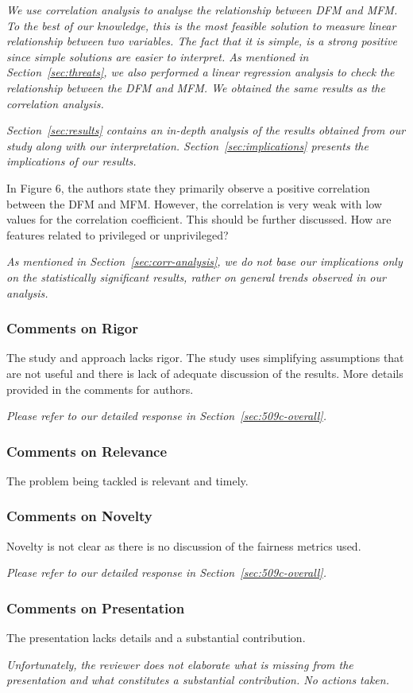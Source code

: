 \documentclass[conference,review,anonymous]{IEEEtran}
\newcommand{\highlight}[1]{\begin{framed}%
  \noindent\emph{#1}
\end{framed}}
\begin{document}
\highlight{We use correlation analysis to analyse the relationship between DFM and MFM. To the best of our knowledge, this is the most feasible solution to measure linear relationship between two variables. The fact that it is simple, is a strong positive since simple solutions are easier to interpret. As mentioned in Section~\ref{sec:threats}, we also performed a linear regression analysis to check the relationship between the DFM and MFM. We obtained the same results as the correlation analysis.}

\highlight{Section~\ref{sec:results} contains an in-depth analysis of the results obtained from our study along with our interpretation. Section~\ref{sec:implications} presents the implications of our results.}

In Figure 6, the authors state they primarily observe a positive correlation between the DFM and MFM. However, the correlation is very weak with low values for the correlation coefficient. This should be further discussed. How are features related to privileged or unprivileged?

\highlight{As mentioned in Section~\ref{sec:corr-analysis}, we do not base our implications only on the statistically significant results, rather on general trends observed in our analysis.}

\subsubsection{Comments on Rigor}

The study and approach lacks rigor. The study uses simplifying
assumptions that are not useful and there is lack of adequate
discussion of the results. More details provided in the comments for
authors.

\highlight{Please refer to our detailed response in
Section~\ref{sec:509c-overall}.}

\subsubsection{Comments on Relevance}
The problem being tackled is relevant and timely.

\subsubsection{Comments on Novelty}
Novelty is not clear as there is no discussion of the fairness metrics
used.

\highlight{Please refer to our detailed response in
Section~\ref{sec:509c-overall}.}

\subsubsection{Comments on Presentation}
The presentation lacks details and a substantial contribution.

\highlight{Unfortunately, the reviewer does not elaborate what is
missing from the presentation and what constitutes a substantial
contribution. No actions taken.}
\end{document}
